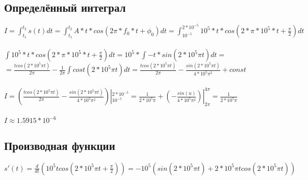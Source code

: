 \documentclass[12pt]{article}
\begin{document}
  \subsection*{Определённый интеграл}
 $I = \int_{t_1}^{t_2} s(t)dt = \int_{t_1}^{t_2} A*t*cos(2\pi*f_0*t + \phi_0)dt = \int_{10^{-5}}^{2*10^{-5}} 10^5 * t * cos(2 * \pi * 10^5 * t + \frac{\pi}{2}) dt$\\
 \\
 $\int 10^5 * t * cos(2 * \pi * 10^5 * t + \frac{\pi}{2}) dt = 10^5 * \int -t*sin(2*10^5\pi t)dt = $ \\
 $ = \frac{tcos(2*10^5\pi t)}{2\pi} - \frac{1}{2\pi}\int cost(2*10^5\pi t)dt = \frac{tcos(2*10^5\pi t)}{2\pi} - \frac{sin(2*10^5\pi t)}{4*10^5\pi^2} + const$\\
 \\
 $I = (\frac{tcos(2*10^5\pi t)}{2\pi} - \frac{sin(2*10^5\pi t)}{4*10^5\pi^2} )|_{10^{-5}}^{2*10^{-5}} = \frac{1}{2*10^5\pi} + (-\frac{sin(u)}{4*10^5\pi^2})|_{2\pi}^{4\pi} = \frac{1}{2*10^5\pi}$\\
 \\
 $I \approx 1.5915 * 10^{-6}$ 
 
  \subsection*{Производная функции}
 $s'(t) = \frac{d}{dt}(10^5tcos(2*10^5\pi t + \frac{\pi}{2})) = -10^5(sin(2*10^5\pi t) + 2*10^5\pi t cos(2*10^5\pi t))$
 
\end{document}
